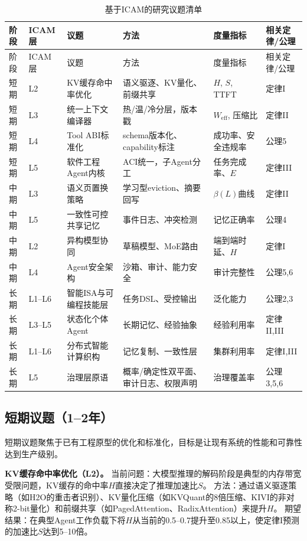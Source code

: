 \begin{longtable}{p{}p{}p{}p{}p{}p{}}
\caption{基于ICAM的研究议题清单}
\label{tab:roadmap}\\
\toprule
阶段 & ICAM层 & 议题 & 方法 & 度量指标 & 相关定律/公理 \\
\midrule
\endfirsthead
\toprule
阶段 & ICAM层 & 议题 & 方法 & 度量指标 & 相关定律/公理 \\
\midrule
\endhead
短期 & L2 & KV缓存命中率优化 & 语义驱逐、KV量化、前缀共享 & $H$, $S$, TTFT & 定律I \\
短期 & L3 & 统一上下文编译器 & 热/温/冷分层，版本戳 & $W_{\mathrm{eff}}$, 压缩比 & 定律II \\
短期 & L4 & Tool ABI标准化 & schema版本化、capability标注 & 成功率、安全违规率 & 公理5 \\
短期 & L5 & 软件工程Agent内核 & ACI统一，子Agent分工 & 任务完成率、$E$ & 定律III \\
中期 & L3 & 语义页置换策略 & 学习型eviction、摘要回写 & $\beta(L)$曲线 & 定律II \\
中期 & L5 & 一致性可控共享记忆 & 事件日志、冲突检测 & 记忆正确率 & 公理4 \\
中期 & L2 & 异构模型协同 & 草稿模型、MoE路由 & 端到端时延、$H$ & 定律I \\
中期 & L4 & Agent安全架构 & 沙箱、审计、能力安全 & 审计完整性 & 公理5,6 \\
长期 & L1--L6 & 智能ISA与可编程技能层 & 任务DSL、受控输出 & 泛化能力 & 公理2,3 \\
长期 & L3--L5 & 状态化个体Agent & 长期记忆、经验抽象 & 经验利用率 & 定律II,III \\
长期 & L1--L6 & 分布式智能计算织构 & 记忆复制、一致性层 & 集群利用率 & 定律I,III \\
长期 & L5 & 治理层原语 & 概率/确定性双平面、审计日志、权限声明 & 治理覆盖率 & 公理3,5,6 \\
\bottomrule
\end{longtable}

\subsection{短期议题（1--2年）}

短期议题聚焦于已有工程原型的优化和标准化，目标是让现有系统的性能和可靠性达到生产级别。

\textbf{KV缓存命中率优化（L2）。}
当前问题：大模型推理的解码阶段是典型的内存带宽受限问题\cite{gholami2024memorywall}，KV缓存的命中率$H$直接决定了推理加速比$S$。
方法：通过语义驱逐策略（如H2O的重击者识别\cite{h2o2023}）、KV量化压缩（如KVQuant的8倍压缩\cite{hooper2024kvquant}、KIVI的非对称2-bit量化\cite{liu2024kivi}）和前缀共享（如PagedAttention\cite{kwon2023pagedattention}、RadixAttention\cite{sglang2024}）来提升$H$。
期望结果：在典型Agent工作负载下将$H$从当前的0.5--0.7提升至0.85以上，使定律I预测的加速比$S$达到5--10倍。

